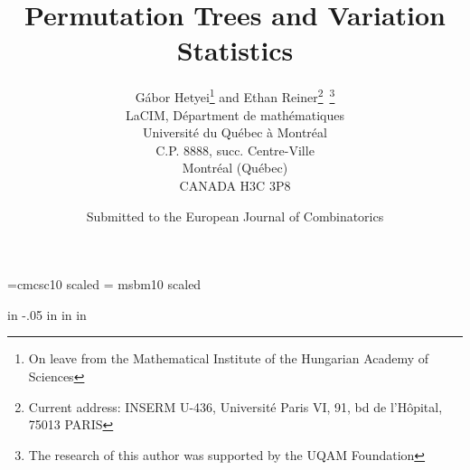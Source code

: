 
\newcommand{\vanish}[1]{}
\newcommand{\al}{{\bf \alpha}}
\newcommand{\pr}{{\bf patt}}
\newcommand{\rev}{{\bf rev}}
\newcommand{\flip}{{\bf flip}}
\newcommand{\df}{\stackrel{\mbox{\rm\tiny\, def }}{=}}
\newcommand{\qed}{\hfill\mbox{$\Box$}\vspace{\baselineskip}}
\newcommand{\rest}[2] { { \left. {#1} \right|_{#2} } }
\newcommand{\scri}{\scriptstyle}

\newcommand{\Zzz}{\hbox{\Cp Z}}

\newenvironment{proof}{\noindent {\em Proof:}}{{\qed}}

\newtheorem{define}{Definition}    %
\newtheorem{prop}{Proposition}     %
\newtheorem{theorem}{Theorem}      %
\newtheorem{corollary}{Corollary}  %
\newtheorem{lemma}{Lemma}          %
\newtheorem{example}{Example}          %


\font\Sc=cmcsc10 scaled
\font\Cp = msbm10 scaled


 in
\oddsidemargin -.05 in
 in
 in






\title{Permutation Trees and Variation Statistics}

\author{{\Sc G\'abor Hetyei\thanks{On leave from the Mathematical
Institute of the Hungarian Academy of Sciences} and Ethan
Reiner\thanks{Current address: INSERM U-436, Universit\'e Paris VI, 91, bd de l'H\^opital, 75013 PARIS}\ \thanks{The research of this author was
supported by the UQAM Foundation}}\\
{ LaCIM, D\'epartment de math\'ematiques}\\
{ Universit\'e du Qu\'ebec \`a Montr\'eal}\\
{ C.P.  8888, succ. Centre-Ville}\\
{ Montr\'eal  (Qu\'ebec)}\\
{ CANADA  H3C 3P8}\\}

\date{Submitted to the European Journal of Combinatorics}

\maketitle

